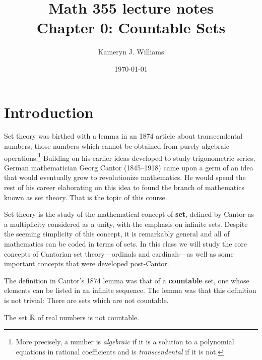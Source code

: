 \documentclass[10pt]{amsart}
\title{Math 355 lecture notes \\ Chapter 0: Countable Sets}
\author{Kameryn J. Williams}
\date{\today}
\begin{document}
\maketitle



\section{Introduction}

Set theory was birthed with a lemma in an 1874 article about transcendental numbers, those numbers which cannot be obtained from purely algebraic operations.\footnote{More precisely, a number is \emph{algebraic} if it is a solution to a polynomial equations in rational coefficients and is \emph{transcendental} if it is not.}
Building on his earlier ideas developed to study trigonometric series, German mathematician Georg Cantor (1845--1918) came upon a germ of an idea that would eventually grow to revolutionize mathematics. He would spend the rest of his career elaborating on this idea to found the branch of mathematics known as set theory. That is the topic of this course.

Set theory is the study of the mathematical concept of \textbf{set}, defined by  Cantor as a multiplicity considered as a unity, with the emphasis on infinite sets. Despite the seeming simplicity of this concept, it is remarkably general and all of mathematics can be coded in terms of sets. In this class we will study the core concepts of Cantorian set theory---ordinals and cardinals---as well as some important concepts that were developed post-Cantor.

The definition in Cantor's 1874 lemma was that of a \textbf{countable} set, one whose elements can be listed in an infinite sequence. The lemma was that this definition is not trivial: There are sets which are not countable.

\begin{lemma*}[Cantor 1874]
The set $\mathbb{R}$ of real numbers is not countable.
\end{lemma*}
\end{document}
